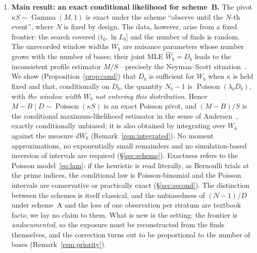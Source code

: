 \documentclass[11pt,a4paper]{article}
\theoremstyle{plain}
\theoremstyle{remark}
\DeclareMathOperator{\Gam}{Gamma}
\DeclareMathOperator{\Pois}{Poisson}
\begin{document}
\begin{enumerate}
\item\textbf{Main result: an exact conditional likelihood for scheme~B.} The
pivot $\kappa S\sim\Gam(M,1)$ is exact under the scheme ``observe until the
$N$-th event'', where $N$ is fixed by design. The data, however, arise from a
fixed frontier: the search covered $(t_0,\ln L_b]$ and the number of finds is
random. The unrecorded window widths $W_b$ are nuisance parameters whose number
grows with the number of bases; their joint MLE $\hat W_b=D_b$ leads to the
inconsistent profile estimator $M/S$---precisely the Neyman--Scott
situation~\cite{neymanscott1948}. We show (Proposition~\ref{prop:cond}) that
$D_b$ is sufficient for $W_b$ when $\kappa$ is held fixed and that,
conditionally on $D_b$, the quantity $N_b-1$ is $\Pois(\lambda_bD_b)$, with
\emph{the window width $W_b$ not entering this distribution}. Hence
$M-B\mid D\sim\Pois(\kappa S)$ is an exact Poisson pivot, and $(M-B)/S$ is the
conditional maximum-likelihood estimator in the sense of
Andersen~\cite{andersen1970}, exactly conditionally unbiased; it is also
obtained by integrating over $W_b$ against the measure $dW_b$
(Remark~\ref{rem:integrated}). No moment approximations, no exponentially small
remainders and no simulation-based inversion of intervals are required
(\S\ref{sec:scheme}). Exactness refers to the Poisson model~\eqref{eq:lam}: if
the heuristic is read literally, as Bernoulli trials at the prime indices, the
conditional law is Poisson-binomial and the Poisson intervals are conservative or
practically exact (\S\ref{sec:second}). The distinction between the schemes is itself classical,
and the unbiasedness of $(N-1)/D$ under scheme~A and the loss of one observation
per stratum are textbook facts; we lay no claim to them. What is new is the
setting: the frontier is \emph{undocumented}, so the exposure must be
reconstructed from the finds themselves, and the correction turns out to be
proportional to the number of bases (Remark~\ref{rem:priority}).


\end{enumerate}
\end{document}
